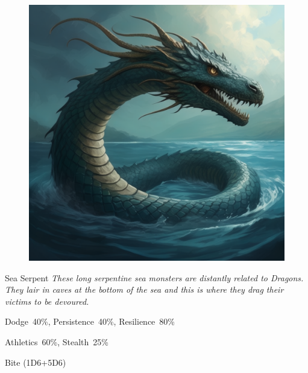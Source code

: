 \begin{figure}[h]
\begin{center}
\includegraphics[scale=0.24]{img/ai-images/sea-serpent.png}
\end{center}
\end{figure}
\begin{monsterbox}{Sea Serpent}
	\textit{These long serpentine sea monsters are distantly related to Dragons. They lair in caves at the bottom of the sea and this is where they drag their victims to be devoured.}\\
	\rpghline
	\basics[%
        hitpoints  = 36,
	majorwound = 18,
	damagemodifier = +5D6,
	powerpoints = 21,
	movementrate = {23m swimming, 0m in land},
	armor = Scales (5AP),
	plunderrating = 3
	]
	\rpghline%
	\stats[ %
		STR = 8D6+30 (58),
		CON = 4D6+21 (35),
		DEX = 2D6    (7),
		SIZ = 6D6+15 (36),
		INT = 3      (3),
		POW = 6D6    (21),
		CHA = 3      (3)
	]
	\rpghline%
	\begin{rpg-monsteraction}[Resistances]
		Dodge~40\%, Persistence~40\%, Resilience~80\%
	\end{rpg-monsteraction}
	\begin{rpg-monsteraction}[Practical]
		Athletics~60\%, Stealth~25\%
	\end{rpg-monsteraction}
	\begin{rpg-monsteraction}
		Bite (1D6+5D6)
	\end{rpg-monsteraction}

\end{monsterbox}

